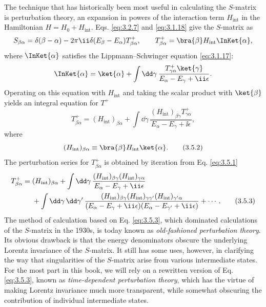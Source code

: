 The technique that has historically been most useful in calculating the $S$-matrix is
perturbation theory, an expansion in powers of the interaction term $H_{\mathrm{int}}$ in the
Hamiltonian $H=H_0+H_{\mathrm{int}}$. Eqs. \eqref{eq:3.2.7} and \eqref{eq:3.1.18} give the $S$-matrix as
\[
 S_{\beta\alpha}=\delta(\beta-\alpha)-2\pi \ii\delta(E_\beta-E_\alpha)T^+_{\beta\alpha},
 \qquad T^+_{\beta\alpha}=\bra{\beta}H_{\mathrm{int}}\InKet{\alpha},
\]
where $\InKet{\alpha}$ satisfies the Lippmann--Schwinger equation \eqref{eq:3.1.17}:
\[
 \InKet{\alpha}=\ket{\alpha}
 +\int \dd\gamma\,\frac{T^+_{\gamma\alpha}\ket{\gamma}}{E_\alpha-E_\gamma+\ii\epsilon}.
\]
Operating on this equation with $H_{\mathrm{int}}$ and taking the scalar product with
$\ket{\beta}$ yields an integral equation for $T^+$
\begin{equation}
 T^+_{\beta\alpha}=(H_{\mathrm{int}})_{\beta\alpha}
 +\int \dd\gamma\,\frac{(H_{\mathrm{int}})_{\beta\gamma}T^+_{\gamma\alpha}}
 {E_\alpha-E_\gamma+\ii\epsilon},
 \tag{3.5.1}\label{eq:3.5.1}
\end{equation}
where
\begin{equation}
 (H_{\mathrm{int}})_{\beta\alpha}\equiv
 \bra{\beta}H_{\mathrm{int}}\ket{\alpha}.
 \tag{3.5.2}\label{eq:3.5.2}
\end{equation}
The perturbation series for $T^+_{\beta\alpha}$ is obtained by iteration from Eq. \eqref{eq:3.5.1}
\begin{align}
 T^+_{\beta\alpha}={}&(H_{\mathrm{int}})_{\beta\alpha}
 +\int \dd\gamma\,\frac{(H_{\mathrm{int}})_{\beta\gamma}
 (H_{\mathrm{int}})_{\gamma\alpha}}{E_\alpha-E_\gamma+\ii\epsilon}\notag\\
 &+\int \dd\gamma\,\dd\gamma'\,
 \frac{(H_{\mathrm{int}})_{\beta\gamma}(H_{\mathrm{int}})_{\gamma\gamma'}
 (H_{\mathrm{int}})_{\gamma'\alpha}}
 {(E_\alpha-E_\gamma+\ii\epsilon)(E_\alpha-E_{\gamma'}+\ii\epsilon)}+\cdots.
 \tag{3.5.3}\label{eq:3.5.3}
\end{align}
The method of calculation based on Eq. \eqref{eq:3.5.3}, which dominated calculations of the $S$-matrix
in the 1930s, is today known as \emph{old-fashioned perturbation theory}. Its obvious drawback
is that the energy denominators obscure the underlying Lorentz invariance of the $S$-matrix.
It still has some uses, however, in clarifying the way that singularities of the $S$-matrix arise
from various intermediate states. For the most part in this book, we will rely on a rewritten
version of Eq. \eqref{eq:3.5.3}, known as \emph{time-dependent perturbation theory}, which has the virtue
of making Lorentz invariance much more transparent, while somewhat obscuring the contribution
of individual intermediate states.

